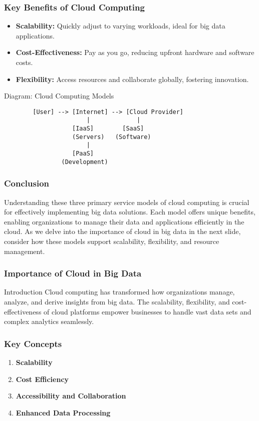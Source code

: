 \documentclass[aspectratio=169]{beamer}
\begin{document}
\begin{frame}[fragile]
    \frametitle{Key Benefits of Cloud Computing}
    \begin{itemize}
        \item \textbf{Scalability:} Quickly adjust to varying workloads, ideal for big data applications.
        \item \textbf{Cost-Effectiveness:} Pay as you go, reducing upfront hardware and software costs.
        \item \textbf{Flexibility:} Access resources and collaborate globally, fostering innovation.
    \end{itemize}
    
    \begin{block}{Diagram: Cloud Computing Models}
        \begin{verbatim}
        [User] --> [Internet] --> [Cloud Provider]
                       |             |
                   [IaaS]        [SaaS]
                   (Servers)   (Software)
                       |
                   [PaaS]
                (Development)
        \end{verbatim}
    \end{block}
\end{frame}

\begin{frame}[fragile]
    \frametitle{Conclusion}
    Understanding these three primary service models of cloud computing is crucial for effectively implementing big data solutions. Each model offers unique benefits, enabling organizations to manage their data and applications efficiently in the cloud. 
    As we delve into the importance of cloud in big data in the next slide, consider how these models support scalability, flexibility, and resource management.
\end{frame}

\begin{frame}[fragile]
  \frametitle{Importance of Cloud in Big Data}
  \begin{block}{Introduction}
    Cloud computing has transformed how organizations manage, analyze, and derive insights from big data. 
    The scalability, flexibility, and cost-effectiveness of cloud platforms empower businesses to handle vast data sets and complex analytics seamlessly.
  \end{block}
\end{frame}

\begin{frame}[fragile]
  \frametitle{Key Concepts}
  \begin{enumerate}
    \item \textbf{Scalability} 
    \item \textbf{Cost Efficiency}
    \item \textbf{Accessibility and Collaboration}
    \item \textbf{Enhanced Data Processing}
  \end{enumerate}
\end{frame}
\end{document}
